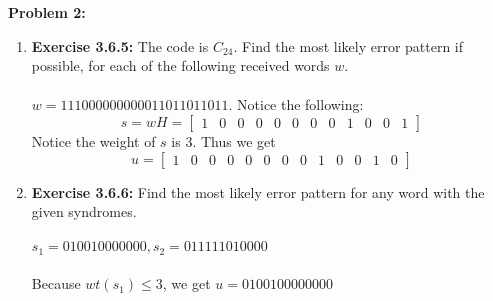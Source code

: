 \documentclass[11pt]{article}
\newenvironment{problem}[1]{\textbf{Problem #1: }}{\newpage}
\begin{document}
	\begin{problem}{2}
		\begin{enumerate}[label = (\alph*)]
			\item \textbf{Exercise 3.6.5:} The code is $C_{24}$. Find the most likely error pattern if possible, for each of the following received words $w$.
			\\ \\
			$w = 1110 0000 0000 0110 1101 1011$.  Notice the following:
			\[s = wH =  \left[ \begin {array}{cccccccccccc} 1&0&0&0&0&0&0&0&1&0&0&1
			\end {array} \right] \]
			Notice the weight of $s$ is 3. Thus we get
			\[u =  \left[ \begin {array}{ccccccccccccc} 1&0&0&0&0&0&0&0&1&0&0&1&0
			\end {array} \right] \]
			\item \textbf{Exercise 3.6.6:} Find the most likely error pattern for any word with the given syndromes.
			\\ \\
			$s_1 = 010010000000, s_2 = 011111010000$
			\\ \\
			Because $wt(s_1) \leq 3$, we get $u = 0100100000000$
		\end{enumerate}
	\end{problem}
\end{document}
